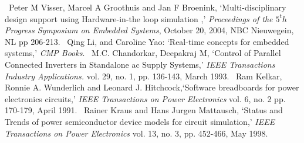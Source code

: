 \begin{thebibliography}{}
~Peter M Visser, Marcel A Groothuis and Jan F Broenink, `Multi-disciplinary design support using Hardware-in-the loop simulation ,'
\emph{ Proceedings of the $5^th$ Progress Symposium on Embedded Systems}, October 20, 2004, NBC Nieuwegein, NL pp 206-213. 
~Qing Li, and Caroline Yao: `Real-time concepts for embedded systems,'  
\emph{CMP Books}. 
~M.C. Chandorkar, Deepakraj M, `Control of Parallel Connected Inverters in Standalone ac Supply Systems,'
\emph{IEEE Transactions Industry Applications.} vol. 29, no. 1, pp. 136-143, March 1993.
~Ram Kelkar, Ronnie A. Wunderlich and Leonard J. Hitchcock,`Software breadboards for power electronics circuits,'
\emph{IEEE Transactions on Power Electronics} vol. 6, no. 2 pp. 170-179, April 1991.
~Rainer Kraus and Hans Jurgen Mattausch, `Status and Trends of power semiconductor device models for circuit simulation,'
\emph{IEEE Transactions on Power Electronics} vol. 13, no. 3,  pp. 452-466, May 1998.
\end{thebibliography}
